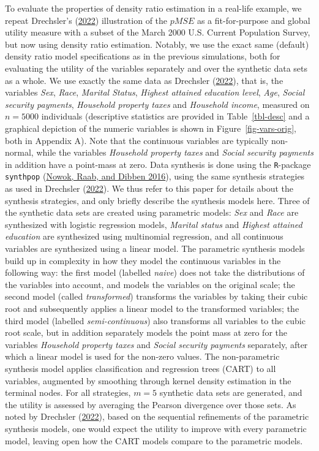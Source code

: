 \documentclass[
]{template/style/uneceart}
\begin{document}
To evaluate the properties of density ratio estimation in a real-life
example, we repeat Drechsler's
(\protect\hyperlink{ref-drechsler_utility_2022}{2022}) illustration of
the \(pMSE\) as a fit-for-purpose and global utility measure with a
subset of the March 2000 U.S. Current Population Survey, but now using
density ratio estimation. Notably, we use the exact same (default)
density ratio model specifications as in the previous simulations, both
for evaluating the utility of the variables separately and over the
synthetic data sets as a whole. We use exactly the same data as
Drechsler (\protect\hyperlink{ref-drechsler_utility_2022}{2022}), that
is, the variables \emph{Sex}, \emph{Race}, \emph{Marital Status},
\emph{Highest attained education level}, \emph{Age}, \emph{Social
security payments}, \emph{Household property taxes} and \emph{Household
income}, measured on \(n = 5000\) individuals (descriptive statistics
are provided in Table~\ref{tbl-desc} and a graphical depiction of the
numeric variables is shown in Figure~\ref{fig-vars-orig}, both in
Appendix A). Note that the continuous variables are typically
non-normal, while the variables \emph{Household property taxes} and
\emph{Social security payments} in addition have a point-mass at zero.
Data synthesis is done using the \texttt{R}-package \texttt{synthpop}
(\protect\hyperlink{ref-nowok2016}{Nowok, Raab, and Dibben 2016}), using
the same synthesis strategies as used in Drechsler
(\protect\hyperlink{ref-drechsler_utility_2022}{2022}). We thus refer to
this paper for details about the synthesis strategies, and only briefly
describe the synthesis models here. Three of the synthetic data sets are
created using parametric models: \emph{Sex} and \emph{Race} are
synthesized with logistic regression models, \emph{Marital status} and
\emph{Highest attained education} are synthesized using multinomial
regression, and all continuous variables are synthesized using a linear
model. The parametric synthesis models build up in complexity in how
they model the continuous variables in the following way: the first
model (labelled \emph{naive}) does not take the distributions of the
variables into account, and models the variables on the original scale;
the second model (called \emph{transformed}) transforms the variables by
taking their cubic root and subsequently applies a linear model to the
transformed variables; the third model (labelled \emph{semi-continuous})
also transforms all variables to the cubic root scale, but in addition
separately models the point mass at zero for the variables
\emph{Household property taxes} and \emph{Social security payments}
separately, after which a linear model is used for the non-zero values.
The non-parametric synthesis model applies classification and regression
trees (CART) to all variables, augmented by smoothing through kernel
density estimation in the terminal nodes. For all strategies, \(m = 5\)
synthetic data sets are generated, and the utility is assessed by
averaging the Pearson divergence over those sets. As noted by Drechsler
(\protect\hyperlink{ref-drechsler_utility_2022}{2022}), based on the
sequential refinements of the parametric synthesis models, one would
expect the utility to improve with every parametric model, leaving open
how the CART models compare to the parametric models.
\end{document}
